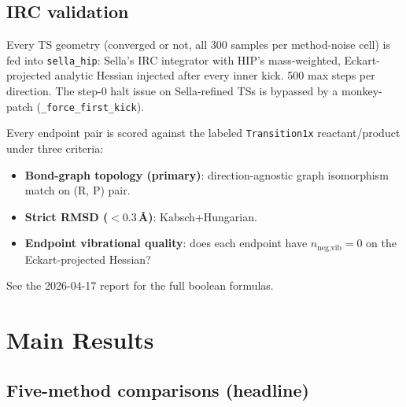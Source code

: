 \documentclass[11pt]{article}
\begin{document}
\subsection{IRC validation}

Every TS geometry (converged or not, all 300 samples per method-noise
cell) is fed into \texttt{sella\_hip}: Sella's IRC integrator with HIP's
mass-weighted, Eckart-projected analytic Hessian injected after every
inner kick. 500 max steps per direction. The step-0 halt issue on
Sella-refined TSs is bypassed by a monkey-patch (\texttt{\_force\_first\_kick}).

Every endpoint pair is scored against the labeled
\texttt{Transition1x} reactant/product under three criteria:

\begin{itemize}[nosep,leftmargin=1.5em]
\item \textbf{Bond-graph topology (primary)}: direction-agnostic
      graph isomorphism match on (R, P) pair.
\item \textbf{Strict RMSD ($<0.3$\,\AA)}: Kabsch+Hungarian.
\item \textbf{Endpoint vibrational quality}: does each endpoint have
      $n_{\text{neg,vib}}=0$ on the Eckart-projected Hessian?
\end{itemize}

See the 2026-04-17 report for the full boolean formulas.

\newpage
\clearpage
\section{Main Results}

\subsection{Five-method comparisons (headline)}
\end{document}
